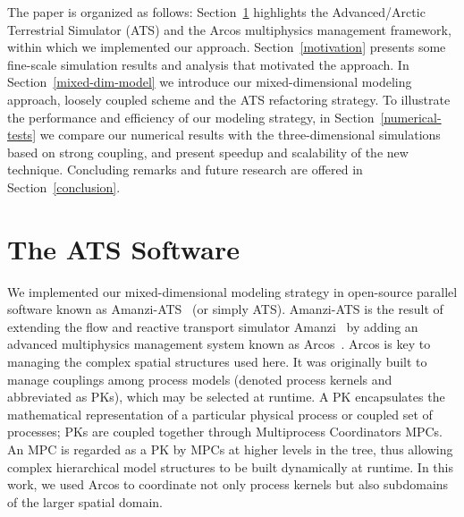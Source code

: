 \documentclass[review]{elsarticle}
\begin{document}



The paper is organized as follows: Section~\ref{arcos-framework} highlights the Advanced/Arctic  Terrestrial Simulator (ATS) and the Arcos multiphysics management framework, within which we implemented our approach. Section~\ref{motivation} presents some fine-scale simulation results and analysis that motivated the approach.  In Section~\ref{mixed-dim-model} we introduce our mixed-dimensional modeling approach, loosely coupled scheme and the ATS refactoring strategy. To illustrate the performance and efficiency of our modeling strategy, in Section~\ref{numerical-tests} we compare our numerical results with the three-dimensional simulations based on strong coupling, and present speedup and scalability of the new technique. Concluding remarks and future research are offered in Section~\ref{conclusion}.

\section{The ATS Software}\label{arcos-framework}

We implemented our mixed-dimensional modeling strategy in open-source parallel software known as Amanzi-ATS~\cite{ats-website} (or simply ATS). Amanzi-ATS is the result of extending the flow and reactive transport  simulator Amanzi~\cite{moulton2012high} by adding an advanced multiphysics management system known as Arcos~\cite{ecoon2016managing}. Arcos is key to managing the complex spatial structures used here. It was originally built to manage couplings among process models (denoted process kernels and abbreviated as PKs), which may be selected at runtime. A PK encapsulates the mathematical representation of a particular physical process or coupled set of processes; PKs are coupled together through Multiprocess Coordinators MPCs. An MPC is regarded as a PK by MPCs at higher levels in the tree, thus allowing complex hierarchical model structures to be built dynamically at runtime. In this work, we used Arcos to coordinate not only process kernels but also subdomains of the larger spatial domain. 
\end{document}
